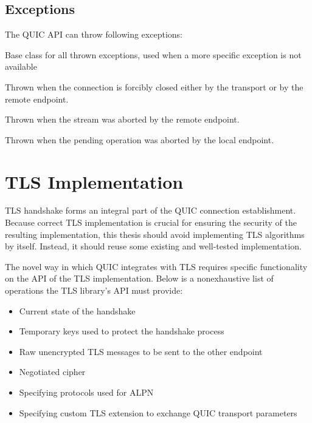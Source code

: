 \subsection{Exceptions}

The QUIC API can throw following exceptions:

\begin{description}

     Base class for all thrown exceptions, used when a more specific exception is not available

     Thrown when the connection is forcibly closed either by the transport or by the remote endpoint.

     Thrown when the stream was aborted by the remote endpoint.

     Thrown when the pending operation was aborted by the local endpoint.

\end{description}

\section{TLS Implementation}


TLS handshake forms an integral part of the QUIC connection establishment. Because correct TLS
implementation is crucial for ensuring the security of the resulting implementation, this thesis
should avoid implementing TLS algorithms by itself. Instead, it should reuse some existing and
well-tested implementation.

The novel way in which QUIC integrates with TLS requires specific functionality on the API of the
TLS implementation. Below is a nonexhaustive list of operations the TLS library's API must provide:

\begin{itemize}

  \item Current state of the handshake

  \item Temporary keys used to protect the handshake process

  \item Raw unencrypted TLS messages to be sent to the other endpoint

  \item Negotiated cipher

  \item Specifying protocols used for ALPN

  \item Specifying custom TLS extension to exchange QUIC transport parameters

\end{itemize}

